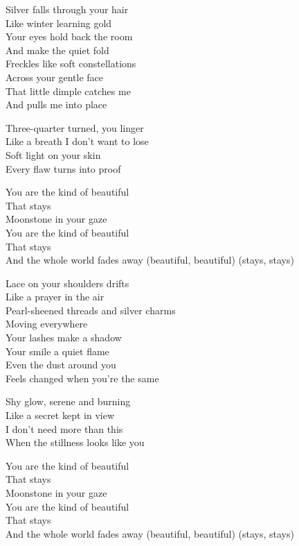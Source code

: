 \begin{lyrics}
Silver falls through your hair\\
Like winter learning gold\\
Your eyes hold back the room\\
And make the quiet fold\\
Freckles like soft constellations\\
Across your gentle face\\
That little dimple catches me\\
And pulls me into place

Three-quarter turned, you linger\\
Like a breath I don’t want to lose\\
Soft light on your skin\\
Every flaw turns into proof

You are the kind of beautiful\\
That stays\\
Moonstone in your gaze\\
You are the kind of beautiful\\
That stays\\
And the whole world fades away
(beautiful, beautiful)
(stays, stays)

Lace on your shoulders drifts\\
Like a prayer in the air\\
Pearl-sheened threads and silver charms\\
Moving everywhere\\
Your lashes make a shadow\\
Your smile a quiet flame\\
Even the dust around you\\
Feels changed when you’re the same

Shy glow, serene and burning\\
Like a secret kept in view\\
I don’t need more than this\\
When the stillness looks like you

You are the kind of beautiful\\
That stays\\
Moonstone in your gaze\\
You are the kind of beautiful\\
That stays\\
And the whole world fades away
(beautiful, beautiful)
(stays, stays)


\end{lyrics}
